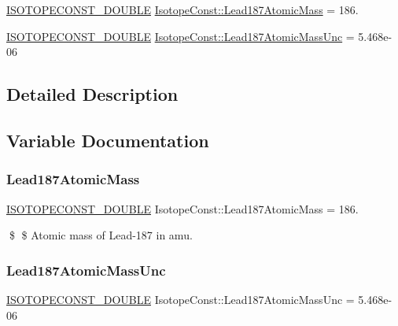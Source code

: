 \begin{DoxyCompactItemize}
\item 
\mbox{\hyperlink{group___isotope_const-_macros_ga8f45a7272ce02c0b4c65c44636ed719a}{I\+S\+O\+T\+O\+P\+E\+C\+O\+N\+S\+T\+\_\+\+D\+O\+U\+B\+LE}} \mbox{\hyperlink{group___isotope_const-_lead-_pb187_gab4cdd3764ed9a24480c1b4997a748e6e}{Isotope\+Const\+::\+Lead187\+Atomic\+Mass}} = 186.
\item 
\mbox{\hyperlink{group___isotope_const-_macros_ga8f45a7272ce02c0b4c65c44636ed719a}{I\+S\+O\+T\+O\+P\+E\+C\+O\+N\+S\+T\+\_\+\+D\+O\+U\+B\+LE}} \mbox{\hyperlink{group___isotope_const-_lead-_pb187_gabddc615b0772dbeb089b736c7b32127a}{Isotope\+Const\+::\+Lead187\+Atomic\+Mass\+Unc}} = 5.\+468e-\/06
\end{DoxyCompactItemize}


\subsection{Detailed Description}


\subsection{Variable Documentation}
\mbox{\label{group___isotope_const-_lead-_pb187_gab4cdd3764ed9a24480c1b4997a748e6e}} 
\subsubsection{\texorpdfstring{Lead187\+Atomic\+Mass}{Lead187AtomicMass}}
{\footnotesize\ttfamily \mbox{\hyperlink{group___isotope_const-_macros_ga8f45a7272ce02c0b4c65c44636ed719a}{I\+S\+O\+T\+O\+P\+E\+C\+O\+N\+S\+T\+\_\+\+D\+O\+U\+B\+LE}} Isotope\+Const\+::\+Lead187\+Atomic\+Mass = 186.}

\$ \$ Atomic mass of Lead-\/187 in amu. \mbox{\label{group___isotope_const-_lead-_pb187_gabddc615b0772dbeb089b736c7b32127a}} 
\subsubsection{\texorpdfstring{Lead187\+Atomic\+Mass\+Unc}{Lead187AtomicMassUnc}}
{\footnotesize\ttfamily \mbox{\hyperlink{group___isotope_const-_macros_ga8f45a7272ce02c0b4c65c44636ed719a}{I\+S\+O\+T\+O\+P\+E\+C\+O\+N\+S\+T\+\_\+\+D\+O\+U\+B\+LE}} Isotope\+Const\+::\+Lead187\+Atomic\+Mass\+Unc = 5.\+468e-\/06}

